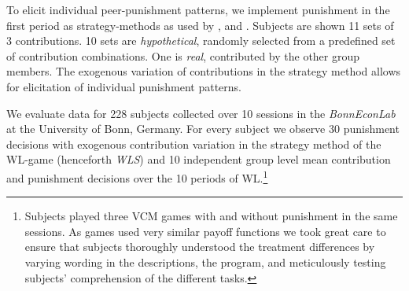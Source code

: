 \documentclass[11pt,a4paper]{article}
\begin{document}
\begin{refsection}
To elicit individual peer-punishment patterns, we
implement punishment in the first period as strategy-methods as used by \cite{Kube2011}, and
\cite{Albrecht2016a}. Subjects are shown 11 sets of 3 contributions. 10 sets 
 are \emph{hypothetical}, randomly selected from a predefined
set of contribution combinations. One is \emph{real}, contributed by the other
group members. The exogenous variation of contributions in the strategy method
allows for elicitation of individual punishment patterns.%

We evaluate data for 228 subjects collected over 10 sessions in the \emph{BonnEconLab}
at the University of Bonn, Germany. For every subject we observe $30$
punishment decisions with exogenous contribution variation in the strategy
method of the WL-game (henceforth \emph{WLS}) and 10 independent group level mean
contribution and punishment decisions over the 10 periods of WL.\footnote{Subjects played three VCM games with and without punishment in
  the same sessions. As games used very similar payoff functions we took great
  care to ensure that subjects thoroughly understood the treatment differences
  by varying wording in the descriptions, the program, and meticulously testing 
  subjects' comprehension of the different tasks.}


\end{refsection}
\end{document}
